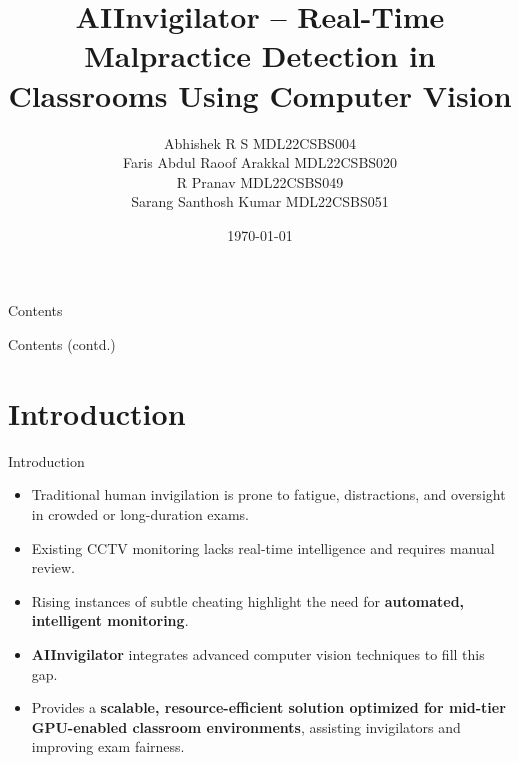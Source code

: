 \documentclass{beamer}
\title{AIInvigilator -- Real-Time Malpractice Detection in Classrooms Using Computer Vision}
\author{
  Abhishek R S \quad MDL22CSBS004\\
  Faris Abdul Raoof Arakkal \quad MDL22CSBS020\\
  R Pranav \quad MDL22CSBS049\\
  Sarang Santhosh Kumar \quad MDL22CSBS051
}
\date{\today}
\begin{document}
\begin{frame}
    \titlepage
\end{frame}

\begin{frame}{Contents}
  \tableofcontents[sections={1-8}]
\end{frame}

\begin{frame}{Contents (contd.)}
  \tableofcontents[sections={9-16}]
\end{frame}

\section{Introduction}
\begin{frame}{Introduction}
\begin{itemize}
    \item Traditional human invigilation is prone to fatigue, distractions, and oversight in crowded or long-duration exams.
    \item Existing CCTV monitoring lacks real-time intelligence and requires manual review.
    \item Rising instances of subtle cheating highlight the need for \textbf{automated, intelligent monitoring}.
    \item \textbf{AIInvigilator} integrates advanced computer vision techniques to fill this gap.
    \item Provides a \textbf{scalable, resource-efficient solution optimized for mid-tier GPU-enabled classroom environments}, assisting invigilators and improving exam fairness.
\end{itemize}
\end{frame}

\end{document}
